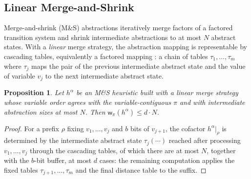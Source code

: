 \documentclass[letterpaper]{article}
\newcommand{\width}{\ensuremath{\mathsf{w}}}
\theoremstyle{plain}
\newtheorem{proposition}{Proposition}
\theoremstyle{definition}
\theoremstyle{remark}
\begin{document}
\subsection{Linear Merge-and-Shrink}

Merge-and-shrink (M\&S) abstractions
\citep{helmert-et-al-jacm2014} iteratively merge factors of a factored
transition system and shrink intermediate abstractions to at most $N$
abstract states. With a \emph{linear} merge strategy, the abstraction
mapping is representable by cascading tables, equivalently a factored
mapping \citep{helmert-et-al-icaps2015}: a chain of tables
$\tau_1, \dots, \tau_m$ where $\tau_j$ maps the pair of the previous
intermediate abstract state and the value of variable $v_j$ to the next
intermediate abstract state.

\begin{proposition}
\label{prop-ms}
Let $h^{\alpha}$ be an M\&S heuristic built with a linear merge
strategy whose variable order agrees with the variable-contiguous
$\pi$ and with intermediate abstraction sizes at most $N$. Then
$\width_\pi(h^{\alpha}) \leq d \cdot N$.
\end{proposition}

\begin{proof}
For a prefix $\rho$ fixing $v_1, \dots, v_j$ and $b$ bits of
$v_{j+1}$, the cofactor $h^{\alpha}|_\rho$ is determined by the
intermediate abstract state $\tau_j(\cdots)$ reached after processing
$v_1, \dots, v_j$ through the cascading tables, of which there are at
most $N$, together with the $b$-bit buffer, at most $d$ cases: the
remaining computation applies the fixed tables
$\tau_{j+1}, \dots, \tau_m$ and the final distance table to the suffix.
\end{proof}
\end{document}
